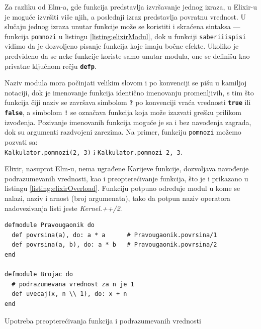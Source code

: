 \documentclass[12pt,oneside]{memoir}
\begin{document}
Za razliku od Elm-a, gde funkcija predstavlja izvršavanje jednog izraza, u Elixir-u
je moguće izvršiti više njih, a poslednji izraz predstavlja povratnu vrednost. U slučaju
jednog izraza unutar funkcije može se koristiti i skraćena sintaksa --- funkcija
\texttt{pomnozi} u listingu \ref{listing:elixirModul}, dok u funkciji
\texttt{saberi\textunderscore{}i\textunderscore{}ispisi} vidimo da je dozvoljeno pisanje
funkcija koje imaju bočne efekte. Ukoliko je predviđeno da se neke funkcije koriste samo
unutar modula, one se definišu kao privatne ključnom rečju \texttt{\textbf{defp}}.

Naziv modula mora počinjati velikim slovom i po konvenciji se pišu u kamiljoj notaciji, dok je 
imenovanje funkcija identično imenovanju promenljivih, s tim što funkcija čiji naziv se 
završava simbolom \texttt{\textbf{?}} po konvenciji vraća vrednosti \texttt{\textbf{true}} ili
\texttt{\textbf{false}}, a simbolom \texttt{\textbf{!}} se označava funkcija koja može izazvati
grešku prilikom izvođenja.
Pozivanje imenovanih funkcija moguće je sa i bez navođenja zagrada, dok su argumenti
razdvojeni zarezima. Na primer, funkciju \texttt{pomnozi} možemo pozvati sa:\\
\texttt{Kalkulator.pomnozi(2, 3)} i \texttt{Kalkulator.pomnozi 2, 3}.

Elixir, nasuprot Elm-u, nema ugrađene Karijeve funkcije, dozvoljava navođenje
podrazumevanih vrednosti, kao i preopterećivanje funkcija, što je i prikazano u listingu
\ref{listing:elixirOverload}. Funkciju potpuno određuje modul u kome se nalazi, naziv i
arnost (broj argumenata), tako da potpun naziv operatora nadovezivanja listi jeste
\emph{Kernel.++/2}. 
\begin{listing}[!h]
\begin{verbatim}
defmodule Pravougaonik do
  def povrsina(a), do: a * a      # Pravougaonik.povrsina/1
  def povrsina(a, b), do: a * b   # Pravougaonik.povrsina/2
end

defmodule Brojac do
  # podrazumevana vrednost za n je 1 
  def uvecaj(x, n \\ 1), do: x + n
end
\end{verbatim}
\caption{Upotreba preopterećivanja funkcija i podrazumevanih vrednosti }
\label{listing:elixirOverload}
\end{listing}
\end{document}
